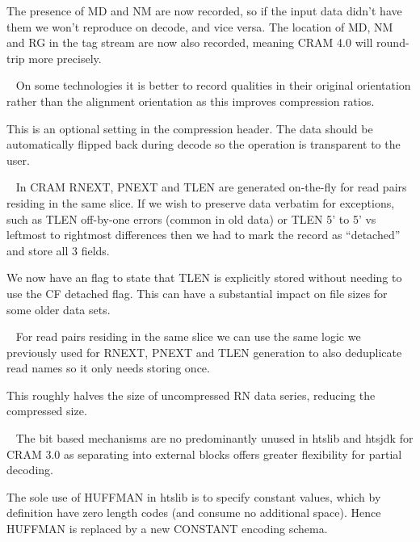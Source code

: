 \documentclass[a4paper]{article}
\begin{document}
\begin{description}
  The presence of MD and NM are now recorded, so if the input data didn't
  have them we won't reproduce on decode, and vice versa.  The
  location of MD, NM and RG in the tag stream are now also recorded,
  meaning CRAM 4.0 will round-trip more precisely.


\item[Quality value orientation]\ \newline
  On some technologies it is better to record qualities in their
  original orientation rather than the alignment orientation as this
  improves compression ratios.

  This is an optional setting in the compression header.  The data
  should be automatically flipped back during decode so the operation
  is transparent to the user.


\item[New CF explicit template size flag]\ \newline
  In CRAM RNEXT, PNEXT and TLEN are generated on-the-fly for read
  pairs residing in the same slice.  If we wish to preserve data
  verbatim for exceptions, such as TLEN off-by-one errors (common in
  old data) or TLEN 5' to 5' vs leftmost to rightmost differences then
  we had to mark the record as ``detached'' and store all 3 fields.

  We now have an flag to state that TLEN is explicitly stored without
  needing to use the CF detached flag.  This can have a substantial
  impact on file sizes for some older data sets.


\item[Deduplication of read names]\ \newline
  For read pairs residing in the same slice we can use the same logic
  we previously used for RNEXT, PNEXT and TLEN generation to also
  deduplicate read names so it only needs storing once.

  This roughly halves the size of uncompressed RN data series,
  reducing the compressed size.

{\color{gray}
\item[(Planned) Removal of CORE block and bit-encodings]\ \newline
  The bit based mechanisms are no predominantly unused in htslib and
  htsjdk for CRAM 3.0 as separating into external blocks offers
  greater flexibility for partial decoding.

  The sole use of HUFFMAN in htslib is to specify constant values,
  which by definition have zero length codes (and consume no
  additional space).  Hence HUFFMAN is replaced by a new CONSTANT
  encoding schema.
}


\end{description}
\end{document}
